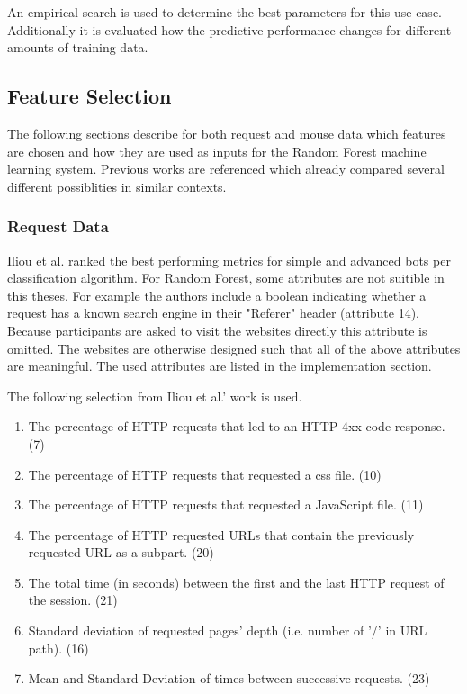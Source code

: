 \documentclass[
    fontsize=12pt,
    headings=small,
    parskip=half,           %
    bibliography=totoc,
    numbers=noenddot,       %
    open=any,               %
    final,                   %
    table
]{scrreprt}
\begin{document}
An empirical search is used to determine the best parameters for this use case. Additionally it is evaluated how the predictive performance changes for different amounts of training data.

\subsection{Feature Selection}

The following sections describe for both request and mouse data which features are chosen and how they are used as inputs for the Random Forest machine learning system. Previous works are referenced which already compared several different possiblities in similar contexts.

\label{concept_request_data}
\subsubsection{Request Data}

Iliou et al. \cite{10.1145/3339252.3339267} ranked the best performing metrics for simple and advanced bots per classification algorithm. For Random Forest, some attributes are not suitible in this theses. For example the authors include a boolean indicating whether a request has a known search engine in their "Referer" header (attribute 14). Because participants are asked to visit the websites directly this attribute is omitted. The websites are otherwise designed such that all of the above attributes are meaningful. The used attributes are listed in the implementation section.

The following selection from Iliou et al.' work \cite{10.1145/3339252.3339267} is used.

\begin{enumerate}
    \item The percentage of HTTP requests that led to an HTTP 4xx code response. (7)
    \item The percentage of HTTP requests that requested a css file. (10)
    \item The percentage of HTTP requests that requested a JavaScript file. (11)
    \item The percentage of HTTP requested URLs that contain the previously requested URL as a subpart. (20)
    \item The total time (in seconds) between the first and the last HTTP request of the session. (21)
    \item Standard deviation of requested pages' depth (i.e. number of ’/’ in URL path). (16)
    \item Mean and Standard Deviation of times between successive requests. (23)
\end{enumerate}
\end{document}

